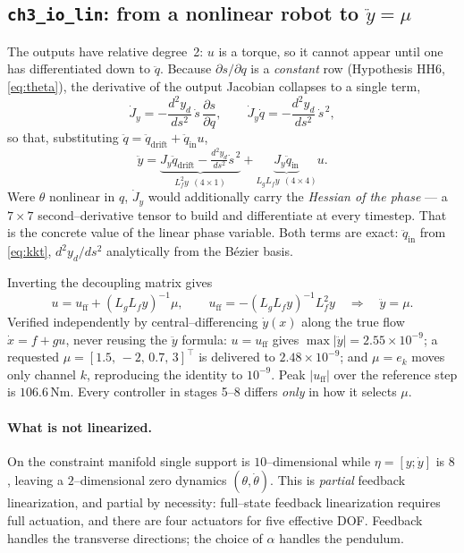 \documentclass[11pt,a4paper]{article}
\newcommand{\code}[1]{\texttt{#1}}          %
\begin{document}
\subsection{\code{ch3\_io\_lin}: from a nonlinear robot to $\ddot y = \mu$}
The outputs have relative degree~2: $u$ is a torque, so it cannot appear until
one has differentiated down to $\ddot q$. Because $\partial s/\partial q$ is a
\emph{constant} row (Hypothesis HH6, \eqref{eq:theta}), the derivative of the
output Jacobian collapses to a single term,
\begin{equation}
  \dot J_y = -\frac{d^2y_d}{ds^2}\,\dot s\,\frac{\partial s}{\partial q},
  \qquad
  \dot J_y\dot q = -\frac{d^2y_d}{ds^2}\,\dot s^{\,2},
\end{equation}
so that, substituting $\ddot q = \ddot q_{\text{drift}} + \ddot q_{\text{in}}u$,
\begin{equation}
  \ddot y = \underbrace{J_y\ddot q_{\text{drift}} - \tfrac{d^2y_d}{ds^2}\dot s^{\,2}}_{L_f^2y\ \ (4\times1)}
          + \underbrace{J_y\ddot q_{\text{in}}}_{L_gL_fy\ \ (4\times4)} u .
\end{equation}
Were $\theta$ nonlinear in $q$, $\dot J_y$ would additionally carry the
\emph{Hessian of the phase} --- a $7\times7$ second--derivative tensor to build
and differentiate at every timestep. That is the concrete value of the linear
phase variable. Both terms are exact: $\ddot q_{\text{in}}$ from \eqref{eq:kkt},
$d^2y_d/ds^2$ analytically from the B\'ezier basis.

Inverting the decoupling matrix gives
\begin{equation}
  u = u_{\mathrm{ff}} + (L_gL_fy)^{-1}\mu,
  \qquad
  u_{\mathrm{ff}} = -(L_gL_fy)^{-1}L_f^2y
  \quad\Longrightarrow\quad
  \ddot y = \mu .
\end{equation}
Verified independently by central--differencing $\dot y(x)$ along the true flow
$\dot x = f+gu$, never reusing the $\ddot y$ formula: $u=u_{\mathrm{ff}}$ gives
$\max|\ddot y| = 2.55\times10^{-9}$; a requested
$\mu = [1.5,\,-2,\,0.7,\,3]^{\top}$ is delivered to $2.48\times10^{-9}$; and
$\mu = e_k$ moves only channel $k$, reproducing the identity to $10^{-9}$. Peak
$|u_{\mathrm{ff}}|$ over the reference step is $106.6\,$Nm. Every controller in
stages 5--8 differs \emph{only} in how it selects $\mu$.

\paragraph{What is not linearized.}
On the constraint manifold single support is $10$--dimensional while
$\eta = [y;\dot y]$ is $8$, leaving a $2$--dimensional zero dynamics
$(\theta,\dot\theta)$. This is \emph{partial} feedback linearization, and
partial by necessity: full--state feedback linearization requires full
actuation, and there are four actuators for five effective DOF. Feedback handles
the transverse directions; the choice of $\alpha$ handles the pendulum.
\end{document}
